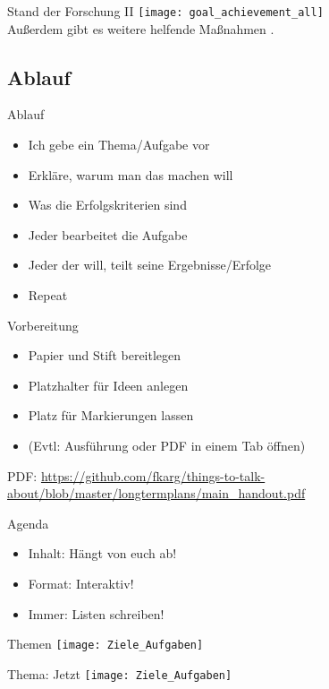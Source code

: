 \begin{frame}[c]{Stand der Forschung II}
    \texttt{[image: goal\_achievement\_all]} \\
    Außerdem gibt es weitere helfende Maßnahmen \cite{better-goals-2}.
\end{frame}



\subsection{Ablauf}


\begin{frame}[c]{Ablauf}
    \begin{itemize}[<+(1)->]
        \item Ich gebe ein Thema/Aufgabe vor
        \item Erkläre, warum man das machen will
        \item Was die Erfolgskriterien sind
        \item Jeder bearbeitet die Aufgabe
        \item Jeder der will, teilt seine Ergebnisse/Erfolge
        \item Repeat
    \end{itemize}
\end{frame}


\begin{frame}[c]{Vorbereitung}
    \begin{itemize}[<+(1)->]
        \item Papier und Stift bereitlegen
        \item Platzhalter für Ideen anlegen
        \item Platz für Markierungen lassen
        \item (Evtl: Ausführung \cite{longtermplans-post} oder PDF \cite{longtermplans-pdf} in einem Tab öffnen)
    \end{itemize}
    \pause
    PDF: \url{https://github.com/fkarg/things-to-talk-about/blob/master/longtermplans/main_handout.pdf}
\end{frame}


\begin{frame}[c]{Agenda}
    \Large
    \begin{itemize}[<+(1)->]
        \item Inhalt: Hängt von euch ab!
        \item Format: Interaktiv!
        \item Immer: Listen schreiben!
    \end{itemize}
\end{frame}


\begin{frame}[c]{Themen}
    \texttt{[image: Ziele\_Aufgaben]}
\end{frame}


\begin{frame}[c]{Thema: Jetzt}
    \texttt{[image: Ziele\_Aufgaben]}
\end{frame}





